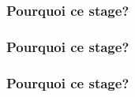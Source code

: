 \documentclass[11pt]{beamer}
\begin{document}
\begin{frame}
  \frametitle{Pourquoi ce stage?}
  \framesubtitle{}
\end{frame}

\begin{frame}
  \frametitle{Pourquoi ce stage?}
  \framesubtitle{}
\end{frame}

\begin{frame}
  \frametitle{Pourquoi ce stage?}
  \framesubtitle{}
\end{frame}
\end{document}
